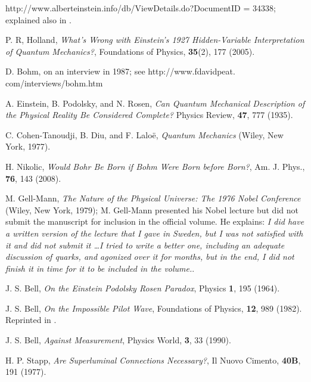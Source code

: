 \documentclass[onecolumn,nofootinbib, secnumarabic, amsmath, nobibnotes,11pt,aps,pra]{revtex4-1}
\begin{document}
\begin{thebibliography}{999}
http://www.alberteinstein.info/db/ViewDetails.do?DocumentID = 34338; explained also in \cite{om.Hollaneinstein}.

P. R, Holland, \emph{What's Wrong with Einstein's 1927 Hidden-Variable Interpretation of Quantum Mechanics?}, Foundations of Physics,
\textbf{35}(2),  177 (2005).\enlargethispage{13pt}

D. Bohm, on an interview in 1987; see http://www.fdavidpeat.  com/interviews/bohm.htm

A. Einstein, B. Podolsky, and N. Rosen, \emph{Can Quantum Mechanical Description of the Physical Reality Be Considered Complete?} Physics Review, \textbf{47},  777 (1935).

C. Cohen-Tanoudji, B. Diu, and F. Lalo\"{e}, \emph{Quantum Mechanics} (Wiley, New York, 1977).

H. Nikolic, \emph{Would Bohr Be Born if Bohm Were Born before Born?}, Am. J. Phys., \textbf{76},  143 (2008).

M. Gell-Mann, \emph{The Nature of the Physical Universe: The 1976 Nobel Conference} (Wiley, New York, 1979); M. Gell-Mann presented his Nobel lecture but did not submit the manuscript for inclusion in the official volume. He explains: \textit{I did have a written version of the lecture that I gave in Sweden, but I was not satisfied with it and did not submit it \ldots I tried to write a better one, including an adequate discussion of quarks, and agonized over it for months, but in the end, I did not finish it in time for it to be included in the volume.}.

J. S. Bell, \emph{On the Einstein Podolsky Rosen Paradox}, Physics {\bf 1},  195 (1964).

J. S. Bell, \emph{On the Impossible Pilot Wave}, Foundations of Physics, \textbf{12},  989 (1982). Reprinted in \cite{om.Bell1987}.

J. S. Bell, \emph{Against Measurement}, Physics World, \textbf{3},  33 (1990).

H. P. Stapp, \emph{Are Superluminal Connections Necessary?}, Il Nuovo Cimento, \textbf{40B},  191 (1977).


\end{thebibliography}
\end{document}
